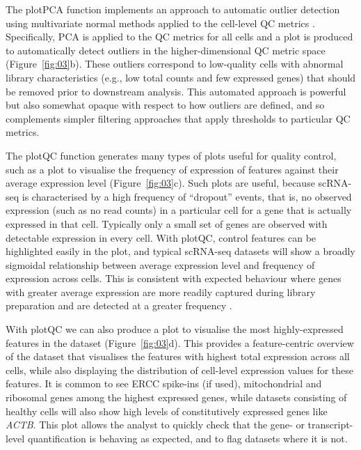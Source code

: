\documentclass{bioinfo}
\begin{document}
The plotPCA function implements an approach to automatic outlier
detection using multivariate normal methods applied to the cell-level QC
metrics \citep{Ilicic2016-dm}. Specifically, PCA is applied to the QC metrics
for all cells and a plot is produced to automatically detect outliers in the
higher-dimensional QC metric space (Figure~\ref{fig:03}b). These outliers
correspond to low-quality cells with abnormal library characteristics (e.g.,
low total counts and few expressed genes) that should be removed prior to
downstream analysis. This automated approach is powerful but also somewhat opaque with respect to how outliers are defined, and so complements simpler filtering approaches that apply thresholds to particular QC metrics.

The plotQC function generates many types of plots useful for quality control,
such as a plot to visualise the frequency of expression of features against their average expression level (Figure~\ref{fig:03}c). Such plots are useful, because scRNA-seq is characterised by a high frequency of ``dropout'' events,
that is, no observed expression (such as no read counts) in a particular
cell for a gene that is actually expressed in that cell. Typically only
a small set of genes are observed with detectable expression in every
cell. With plotQC, control features can be highlighted easily in the plot, and
typical scRNA-seq datasets will show a broadly sigmoidal relationship between
average expression level and frequency of expression across cells. This is
consistent with expected behaviour where genes with greater average expression
are more readily captured during library preparation and are detected at a
greater frequency \citep{Brennecke2013-zv,Kim2015-xd,Vallejos2015-ww}.

With plotQC we can also produce a plot to visualise the most
highly-expressed features in the dataset (Figure~\ref{fig:03}d). This
provides a feature-centric overview of the dataset that visualises the features
with highest total expression across all cells,
while also displaying the distribution of cell-level expression values
for these features. It is common to see ERCC spike-ins (if used),
mitochondrial and ribosomal genes among the highest expressed genes,
while datasets consisting of healthy cells will also show high levels of
constitutively expressed genes like \emph{ACTB}. This
plot allows the analyst to quickly check that the gene- or
transcript-level quantification is behaving as expected, and to flag
datasets where it is not.
\end{document}

